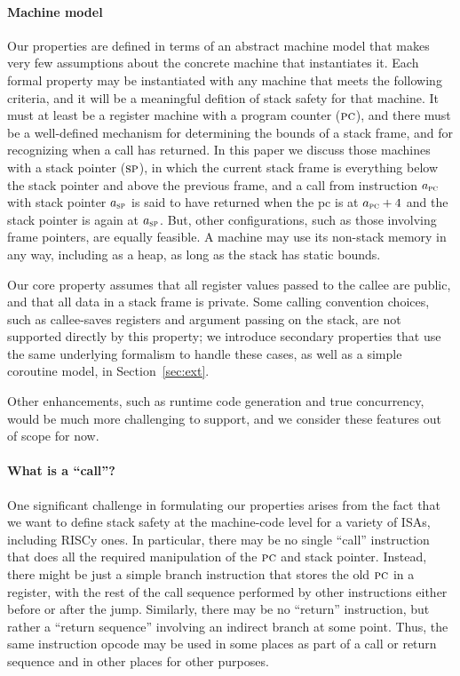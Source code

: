 \documentclass[acmsmall,review,anonymous]{acmart}\settopmatter{printfolios=true,printccs=false,printacmref=false}
\begin{document}
{\paragraph*{Machine model}
Our properties are defined in terms of an abstract machine model that makes very few
assumptions about the concrete machine that instantiates it. Each formal property
may be instantiated with any machine that meets the following criteria, and it
will be a meaningful defition of stack safety for that machine. It must at least be a
register machine with a program counter (\(\textsc{pc}\)), and there must be a well-defined
mechanism for determining the bounds of a stack frame, and for recognizing when a call
has returned. In this paper we discuss those machines with a stack pointer (\(\textsc{sp}\)),
in which the current stack frame is everything below the stack pointer and above the
previous frame, and a call from instruction \(a_{\textsc{pc}}\) with stack pointer \(a_{\textsc{sp}}\)
is said to have returned when the pc is at \(a_{\textsc{pc}} + 4\) and the stack pointer
is again at \(a_{\textsc{sp}}\). But, other configurations, such as those involving frame pointers,
are equally feasible. A machine may use its non-stack memory in any way, including
as a heap, as long as the stack has static bounds.

Our core property assumes that all register values passed to the callee are public,
and that all data in a stack frame is private.
Some calling convention choices, such as callee-saves registers and argument
passing on the stack, are not supported directly by this property; we introduce
secondary properties that use the same underlying formalism to handle these cases,
as well as a simple coroutine model, in Section~\ref{sec:ext}.

Other enhancements, such as runtime code generation and true concurrency,
would be much more challenging to support, and we consider these features
out of scope for now.

\paragraph*{What is a ``call''?}  One significant challenge in formulating our
properties arises from the fact that we want to define stack safety at the
machine-code level for a variety of ISAs, including RISCy
\ifaftersubmission{}\fi ones.  In
particular, there may be no single ``call'' instruction that does all the
required manipulation of the \(\textsc{pc}\) and stack pointer. Instead, there
might be just a simple branch instruction that stores the old \(\textsc{pc}\) in
a register, with the rest of the call sequence performed by other
instructions either before or after the jump.  Similarly, there may be no
``return'' instruction, but rather a ``return sequence'' involving an
indirect branch at some point.  Thus, the same instruction opcode may be
used in some places as part of a call or return sequence and in other places
for other purposes.

}
\end{document}
